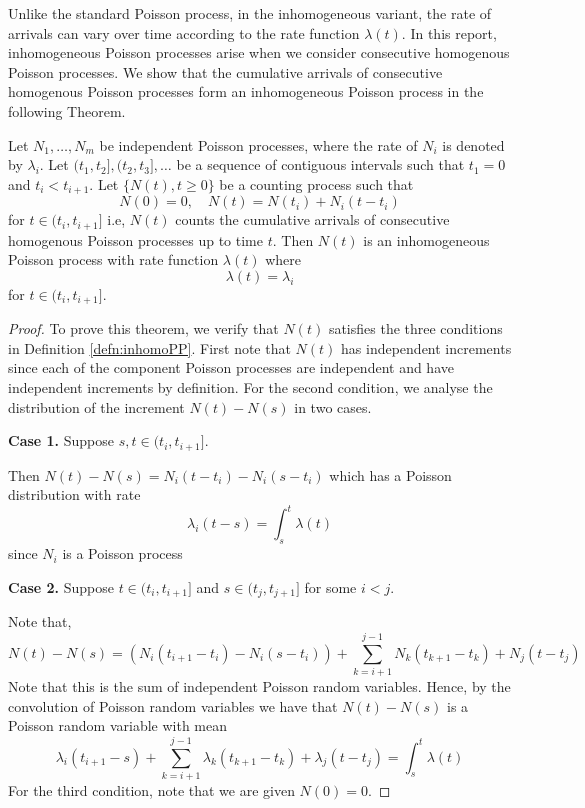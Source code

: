 Unlike the standard Poisson process, in the inhomogeneous variant, the rate of arrivals can vary over time according to the rate function $\lambda(t)$. In this report, inhomogeneous Poisson processes arise when we consider consecutive homogenous Poisson processes. We show that the cumulative arrivals of consecutive homogenous Poisson processes form an inhomogeneous Poisson process in the following Theorem.

\begin{theorem}
	Let $N_1, \dots, N_m$ be independent Poisson processes, where the rate of $N_i$ is denoted by $\lambda_i$. Let $(t_1, t_2], (t_2, t_3], \dots$ be a sequence of contiguous intervals such that $t_1 = 0$ and $t_i < t_{i+1}$. Let $\{N(t), t \geq 0\}$ be a counting process such that
	$$
		N(0) = 0, \quad N(t) = N(t_i) + N_i(t - t_i)
	$$ 
	for $t \in (t_i, t_{i+1}]$ i.e, $N(t)$ counts the cumulative arrivals of consecutive homogenous Poisson processes up to time $t$. Then $N(t)$ is an inhomogeneous Poisson process with rate function $\lambda(t)$ where
	$$
		\lambda(t) = \lambda_i
	$$
	for $t \in (t_i, t_{i+1}]$.
\end{theorem}

\begin{proof}
	To prove this theorem, we verify that $N(t)$ satisfies the three conditions in Definition \ref{defn:inhomoPP}. First note that $N(t)$ has independent increments since each of the component Poisson processes are independent and have independent increments by definition. For the second condition, we analyse the distribution of the increment $N(t) - N(s)$ in two cases.

	\textbf{Case 1.} Suppose $s, t \in (t_i, t_{i+1}]$. 
	
	\noindent
	Then $N(t) - N(s) = N_i(t - t_i) - N_i(s - t_i)$ which has a Poisson distribution with rate $$
		\lambda_i(t-s) = \int_s^t \lambda(t)
	$$
	since $N_i$ is a Poisson process

	\textbf{Case 2.} Suppose $t \in (t_i, t_{i+1}]$ and $s \in (t_j, t_{j+1}]$ for some $i < j$.
	
	\noindent
	Note that, 
	$$
		N(t) - N(s) = (N_i(t_{i+1} - t_i) - N_i(s - t_i)) + \sum_{k=i+1}^{j-1} N_k(t_{k+1} - t_k) + N_j(t - t_j)
	$$
	Note that this is the sum of independent Poisson random variables. Hence, by the convolution of Poisson random variables we have that $N(t) - N(s)$ is a Poisson random variable with mean
	$$
		\lambda_i(t_{i+1} - s) + \sum_{k=i+1}^{j-1} \lambda_k(t_{k+1} - t_k) + \lambda_j(t - t_j) = \int_s^t \lambda(t) 
	$$
	For the third condition, note that we are given $N(0) = 0$.
\end{proof}

